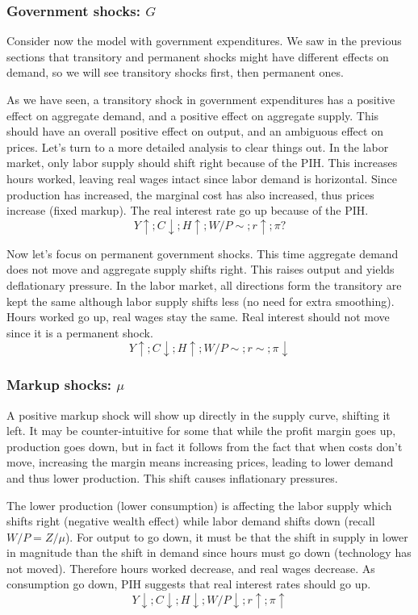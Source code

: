 \documentclass[12pt]{report}
\begin{document}
\subsubsection{Government shocks: $G$}

Consider now the model with government expenditures. We saw in the previous sections that transitory and permanent shocks might have different effects on demand, so we will see transitory shocks first, then permanent ones.

As we have seen, a transitory shock in government expenditures has a positive effect on aggregate demand, and a positive effect on aggregate supply. This should have an overall positive effect on output, and an ambiguous effect on prices. Let's turn to a more detailed analysis to clear things out. In the labor market, only labor supply should shift right because of the PIH. This increases hours worked, leaving real wages intact since labor demand is horizontal. Since production has increased, the marginal cost has also increased, thus prices increase (fixed markup). The real interest rate go up because of the PIH.
$$Y\uparrow ; C\downarrow ; H\uparrow ; W/P\sim ; r\uparrow ; \pi ? $$

Now let's focus on permanent government shocks. This time aggregate demand does not move and aggregate supply shifts right. This raises output and yields deflationary pressure. In the labor market, all directions form the transitory are kept the same although labor supply shifts less (no need for extra smoothing). Hours worked go up, real wages stay the same. Real interest should not move since it is a permanent shock.
$$Y\uparrow ; C\downarrow ; H\uparrow ; W/P\sim ; r\sim ; \pi \downarrow $$

\subsubsection{Markup shocks: $\mu$}

A positive markup shock will show up directly in the supply curve, shifting it left. It may be counter-intuitive for some that while the profit margin goes up, production goes down, but in fact it follows from the fact that when costs don't move, increasing the margin means increasing prices, leading to lower demand and thus lower production. This shift causes inflationary pressures. 

The lower production (lower consumption) is affecting the labor supply which shifts right (negative wealth effect) while labor demand shifts down (recall $W/P = Z/\mu$). For output to go down, it must be that the shift in supply in lower in magnitude than the shift in demand since hours must go down (technology has not moved). Therefore hours worked decrease, and real wages decrease. As consumption go down, PIH suggests that real interest rates should go up.
$$ Y\downarrow ; C\downarrow ; H\downarrow ; W/P\downarrow ; r\uparrow ; \pi\uparrow $$
\end{document}
